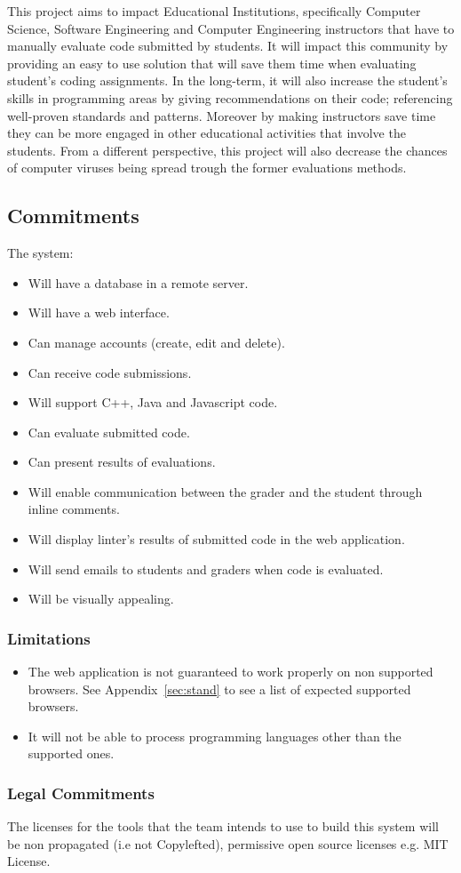 
This project aims to impact Educational Institutions, specifically Computer
Science, Software Engineering and Computer Engineering instructors that have to
manually evaluate code submitted by students. It will impact this community by
providing an easy to use solution that will save them time when evaluating
student's coding assignments. In the long-term, it will also increase the
student's skills in programming areas by giving recommendations on their code;
referencing well-proven standards and patterns. Moreover by making instructors
save time they can be more engaged in other educational activities that involve 
the students. From a different perspective, this project will also decrease the
chances of computer viruses being spread trough the former evaluations methods.

\subsection{Commitments}
The system:
\begin{itemize}
\item Will have a database in a remote server.
\item Will have a web interface.
\item Can manage accounts (create, edit and delete).
\item Can receive code submissions.
\item Will support C++, Java and Javascript code.
\item Can evaluate submitted code.
\item Can present results of evaluations.
\item Will enable communication between the grader and the student through
inline comments.
\item Will display linter's results of submitted code in the web application.
\item Will send emails to students and graders when code is evaluated.
\item Will be visually appealing.
\end{itemize}

\subsubsection{Limitations}
\begin{itemize}
\item The web application is not guaranteed to work properly on non supported
browsers. See Appendix~\ref{sec:stand} to see a list of expected supported browsers.
\item It will not be able to process programming languages other than the
supported ones.
\end{itemize}

\subsubsection{Legal Commitments}

The licenses for the tools that the team intends to use to build this system
will be non propagated (i.e not Copylefted), permissive open source licenses
e.g. MIT License.
